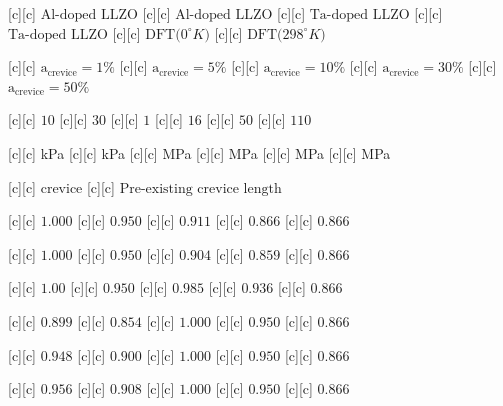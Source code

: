 [c][c] {$\text{Al-doped LLZO}$}
[c][c] {$\text{Al-doped LLZO}$}
[c][c] {$\text{Ta-doped LLZO}$}
[c][c] {$\text{Ta-doped LLZO}$}
[c][c] {$\text{DFT($0^{\circ}K$)}$}
[c][c] {$\text{DFT($298^{\circ}K$)}$}

[c][c] {\tiny $\text{a}_{\text{crevice}}\!=1\%$}
[c][c] {\tiny $\text{a}_{\text{crevice}}\!=5\%$}
[c][c] {\tiny $\text{a}_{\text{crevice}}\!=10\%$}
[c][c] {\tiny $\text{a}_{\text{crevice}}\!=30\%$}
[c][c] {\tiny $\text{a}_{\text{crevice}}\!=50\%$}

[c][c] {\footnotesize $10$}
[c][c] {\footnotesize $30$}
[c][c] {\footnotesize $1$}
[c][c] {\footnotesize $16$}
[c][c] {\footnotesize $50$}
[c][c] {\footnotesize $110$}

[c][c] {\footnotesize kPa}
[c][c] {\footnotesize kPa}
[c][c] {\footnotesize MPa}
[c][c] {\footnotesize MPa}
[c][c] {\footnotesize MPa}
[c][c] {\footnotesize MPa}

[c][c] {$\text{crevice}$}
[c][c] {$\text{Pre-existing crevice length}$}

[c][c] {\tiny $1.000$}
[c][c] {\tiny $0.950$}
[c][c] {\tiny $0.911$}
[c][c] {\tiny $0.866$}
[c][c] {\tiny $0.866$}

[c][c] {\tiny $1.000$}
[c][c] {\tiny $0.950$}
[c][c] {\tiny $0.904$}
[c][c] {\tiny $0.859$}
[c][c] {\tiny $0.866$}

[c][c] {\tiny $1.00$}
[c][c] {\tiny $0.950$}
[c][c] {\tiny $0.985$}
[c][c] {\tiny $0.936$}
[c][c] {\tiny $0.866$}

[c][c] {\tiny $0.899$}
[c][c] {\tiny $0.854$}
[c][c] {\tiny $1.000$}
[c][c] {\tiny $0.950$}
[c][c] {\tiny $0.866$}

[c][c] {\tiny $0.948$}
[c][c] {\tiny $0.900$}
[c][c] {\tiny $1.000$}
[c][c] {\tiny $0.950$}
[c][c] {\tiny $0.866$}

[c][c] {\tiny $0.956$}
[c][c] {\tiny $0.908$}
[c][c] {\tiny $1.000$}
[c][c] {\tiny $0.950$}
[c][c] {\tiny $0.866$}


